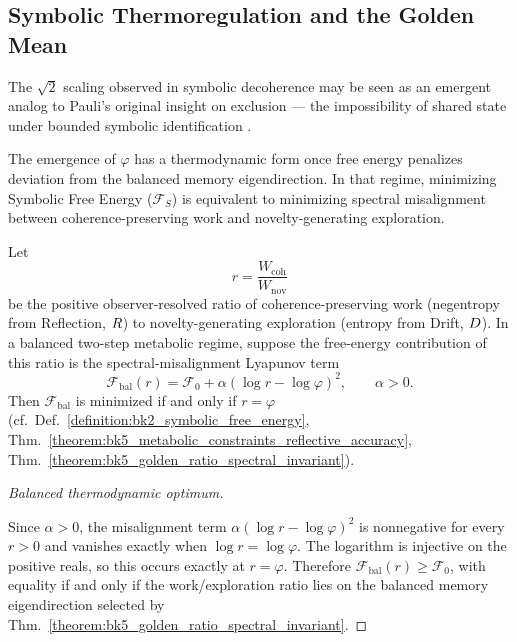 \subsection{Symbolic Thermoregulation and the Golden Mean}
\label{subsec:bk5_thermoregulation_and_phi}

The $\sqrt{2}$ scaling observed in symbolic decoherence may be seen as an emergent analog to Pauli’s original insight on exclusion — the impossibility of shared state under bounded symbolic identification \cite{pauli1925exclusion}.

The emergence of $\varphi$ has a thermodynamic form once free energy penalizes deviation from the balanced memory eigendirection. In that regime, minimizing Symbolic Free Energy ($\mathcal{F}_S$) is equivalent to minimizing spectral misalignment between coherence-preserving work and novelty-generating exploration.

\begin{proposition}
\label{proposition:bk5_golden_ratio_thermodynamic_optimum}
Let
\[
r=\frac{W_{\mathrm{coh}}}{W_{\mathrm{nov}}}
\]
be the positive observer-resolved ratio of coherence-preserving work
(negentropy from Reflection, $R$) to novelty-generating exploration
(entropy from Drift, $D$).  In a balanced two-step metabolic regime, suppose
the free-energy contribution of this ratio is the spectral-misalignment
Lyapunov term
\[
\mathcal{F}_{\mathrm{bal}}(r)=\mathcal{F}_0+\alpha(\log r-\log\varphi)^2,
\qquad \alpha>0.
\]
Then $\mathcal{F}_{\mathrm{bal}}$ is minimized if and only if $r=\varphi$
(cf.~Def.~\ref{definition:bk2_symbolic_free_energy},
Thm.~\ref{theorem:bk5_metabolic_constraints_reflective_accuracy},
Thm.~\ref{theorem:bk5_golden_ratio_spectral_invariant}).
\end{proposition}

\begin{proof}[Balanced thermodynamic optimum]
\label{proof:bk5_golden_ratio_thermodynamic_optimum}
\leavevmode

Since $\alpha>0$, the misalignment term
$\alpha(\log r-\log\varphi)^2$ is nonnegative for every $r>0$ and vanishes
exactly when $\log r=\log\varphi$.  The logarithm is injective on the positive
reals, so this occurs exactly at $r=\varphi$.  Therefore
$\mathcal{F}_{\mathrm{bal}}(r)\geq\mathcal{F}_0$, with equality if and only if
the work/exploration ratio lies on the balanced memory eigendirection selected
by Thm.~\ref{theorem:bk5_golden_ratio_spectral_invariant}.
\end{proof}

